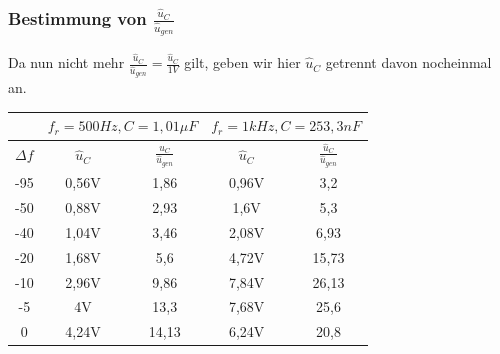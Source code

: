 \documentclass{article}
\begin{document}
\newpage
\subsubsection{Bestimmung von $\frac{\hat{u}_C}{\hat{u}_{gen}}$}

Da nun nicht mehr $\frac{\hat{u}_C}{\hat{u}_{gen}} = \frac{\hat{u}_C}{1V}$ gilt, geben wir hier $\hat{u}_C$ getrennt davon nocheinmal an.

\begin{table}[h]
  \begin{center}

    \begin{tabular}{|c|c|c|c|c|}
      \hline
                 & \multicolumn{2}{c|}{$f_r = 500Hz, C = 1,01\mu F$} & \multicolumn{2}{c|}{$f_r = 1kHz, C= 253,3 nF$}                                                   \\
      \hline
      $\Delta f$ & $\hat{u}_C$                                       & $\frac{\hat{u}_C}{\hat{u}_{gen}}$              & $\hat{u}_C$ & $\frac{\hat{u}_C}{\hat{u}_{gen}}$ \\
      \hline
      -95        & 0,56V                                             & 1,86                                           & 0,96V       & 3,2                               \\
      \hline
      -50        & 0,88V                                             & 2,93                                           & 1,6V        & 5,3                               \\
      \hline
      -40        & 1,04V                                             & 3,46                                           & 2,08V       & 6,93                              \\
      \hline
      -20        & 1,68V                                             & 5,6                                            & 4,72V       & 15,73                             \\
      \hline
      -10        & 2,96V                                             & 9,86                                           & 7,84V       & 26,13                             \\
      \hline
      -5         & 4V                                                & 13,3                                           & 7,68V       & 25,6                              \\
      \hline
      0          & 4,24V                                             & 14,13                                          & 6,24V       & 20,8                              \\

\end{tabular}
\end{center}
\end{table}
\end{document}
